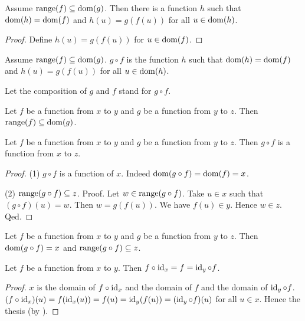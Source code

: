 \documentclass[../../set-theory.ftl.tex]{subfiles}
\begin{document}
  \begin{forthel}
    \begin{lemma}
      Assume $\operatorname{range}(f) \subseteq \operatorname{dom}(g)$.
      Then there is a function $h$ such that $\operatorname{dom}(h) = \operatorname{dom}(f)$ and $h(u) = g(f(u))$ for all $u \in \operatorname{dom}(h)$.
    \end{lemma}
    \begin{proof}
      Define $h(u) = g(f(u))$ for $u \in \operatorname{dom}(f)$.
    \end{proof}

    \begin{definition}
      Assume $\operatorname{range}(f) \subseteq \operatorname{dom}(g)$.
      $g \circ f$ is the function $h$ such that $\operatorname{dom}(h) = \operatorname{dom}(f)$ and $h(u) = g(f(u))$ for all $u \in \operatorname{dom}(h)$.
    \end{definition}

    Let the composition of $g$ and $f$ stand for $g \circ f$.

    \begin{lemma}
      Let $f$ be a function from $x$ to $y$ and $g$ be a function from $y$ to $z$.
      Then $\operatorname{range}(f) \subseteq \operatorname{dom}(g)$.
    \end{lemma}

    \begin{proposition}\label{SetTheory_02_01_289732}
      Let $f$ be a function from $x$ to $y$ and $g$ be a function from $y$ to $z$.
      Then $g \circ f$ is a function from $x$ to $z$.
    \end{proposition}
    \begin{proof}
      (1) $g \circ f$ is a function of $x$.
      Indeed $\operatorname{dom}(g \circ f) = \operatorname{dom}(f) = x$.

      (2) $\operatorname{range}(g \circ f) \subseteq z$.
      Proof.
        Let $w \in \operatorname{range}(g \circ f)$.
        Take $u \in x$ such that $(g \circ f)(u) = w$.
        Then $w = g(f(u))$.
        We have $f(u) \in y$.
        Hence $w \in z$.
      Qed.
    \end{proof}

    \begin{lemma}
      Let $f$ be a function from $x$ to $y$ and $g$ be a function from $y$ to $z$.
      Then $\operatorname{dom}(g \circ f) = x$ and $\operatorname{range}(g \circ f) \subseteq z$.
    \end{lemma}

    \begin{proposition}\label{SetTheory_02_01_718601}
      Let $f$ be a function from $x$ to $y$.
      Then $f \circ \operatorname{id}_{x} = f = \operatorname{id}_{y} \circ f$.
    \end{proposition}
    \begin{proof}
      $x$ is the domain of $f \circ \operatorname{id}_{x}$ and the domain of $f$ and the domain of $\operatorname{id}_{y} \circ f$.
      $(f \circ \operatorname{id}_{x})(u) = f(\operatorname{id}_{x}(u)) = f(u) = \operatorname{id}_{y}(f(u)) = (\operatorname{id}_{y} \circ f)(u)$ for all $u \in x$.
      Hence the thesis (by ).
    \end{proof}


\end{forthel}
\end{document}
